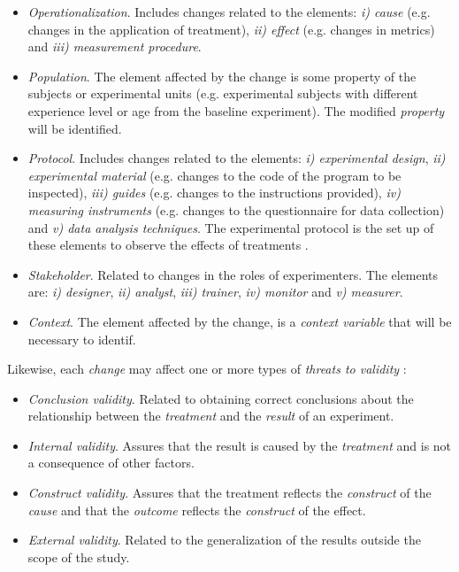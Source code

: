 \begin{itemize}
    \item \textit{Operationalization}. Includes changes related to the elements: \emph{i) cause} (e.g. changes in the application of treatment), \emph{ii) effect} (e.g. changes in metrics) and \emph{iii) measurement procedure}.
    
    \item \textit{Population}. The element affected by the change is some property of the subjects or experimental units (e.g. experimental subjects with different experience level or age from the baseline experiment). The modified \emph{property} will be identified.
    
    \item \textit{Protocol}. Includes changes related to the elements: \emph{i) experimental design}, \emph{ii) experimental material} (e.g. changes to the code of the program to be inspected), \emph{iii) guides} (e.g. changes to the instructions provided), \emph{iv) measuring instruments} (e.g. changes to the questionnaire for data collection)  and \emph{v) data analysis techniques}. The experimental protocol is the set up of these elements to observe the effects of treatments \cite{Juristo2012}.

    \item \textit{Stakeholder}. Related to changes in the roles of experimenters. The elements are: \emph{i) designer}, \emph{ii) analyst}, \emph{iii) trainer}, \emph{iv) monitor} and \emph{v) measurer}.
    
    \item \textit{Context}. The element affected by the change, is a \emph{context variable} that will be necessary to identif. %
    
\end{itemize}    

Likewise, each \emph{change} may affect one or more types of \emph{threats to validity} \cite{wohlin:experimentation}:

\begin{itemize}
    \item \emph{Conclusion validity}. Related to obtaining correct conclusions about the relationship between the \emph{treatment} and the \emph{result} of an experiment.
    
    \item \emph{Internal validity}. Assures that the result is caused by the \emph{treatment} and is not a consequence of other factors.
     
    \item \emph{Construct validity}. Assures that the treatment reflects the \emph{construct} of the \emph{cause} and  that the \emph{outcome} reflects the \emph{construct} of the effect.
    
    \item \emph{External validity}. Related to the generalization of the results outside the scope of the study.
\end{itemize}

